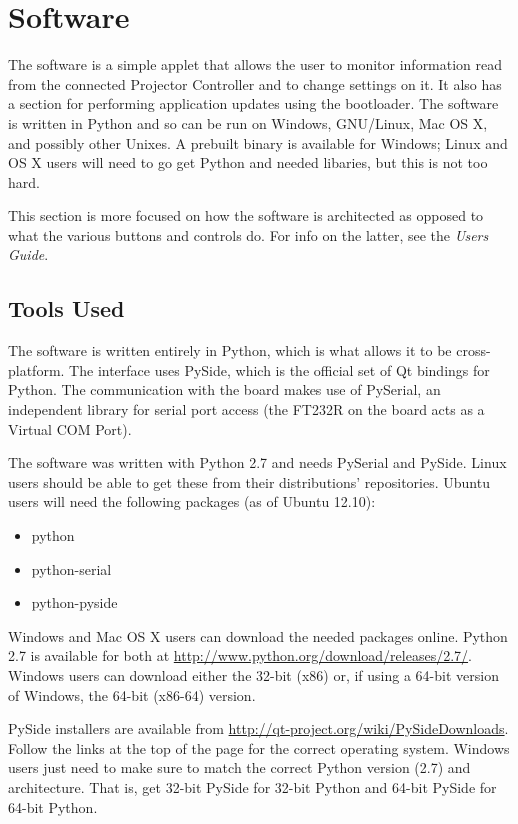 \documentclass{article}
\begin{document}
\section{Software} \label{sec:software}
The software is a simple applet that allows the user to monitor information read from the connected
Projector Controller and to change settings on it.  It also has a section for performing application
updates using the bootloader.  The software is written in Python and so can be run on Windows,
GNU/Linux, Mac OS X, and possibly other Unixes.  A prebuilt binary is available for Windows; Linux
and OS X users will need to go get Python and needed libaries, but this is not too hard.

This section is more focused on how the software is architected as opposed to what the various
buttons and controls do.  For info on the latter, see the \emph{Users Guide}.

\subsection{Tools Used} \label{ssec:SWTools} 
The software is written entirely in Python, which is what allows it to be cross-platform.  The
interface uses PySide, which is the official set of Qt bindings for Python.  The communication with
the board makes use of PySerial, an independent library for serial port access (the FT232R on the
board acts as a Virtual COM Port).

The software was written with Python 2.7 and needs PySerial and PySide.  Linux users should be able
to get these from their distributions' repositories.  Ubuntu users will need the following packages
(as of Ubuntu 12.10):

\begin{itemize}
  \item python
  \item python-serial
  \item python-pyside
\end{itemize}

Windows and Mac OS X users can download the needed packages online.  Python 2.7 is available for
both at \url{http://www.python.org/download/releases/2.7/}.  Windows users can download either the
32-bit (x86) or, if using a 64-bit version of Windows, the 64-bit (x86-64) version.

PySide installers are available from \url{http://qt-project.org/wiki/PySideDownloads}.  Follow the
links at the top of the page for the correct operating system.  Windows users just need to make sure
to match the correct Python version (2.7) and architecture.  That is, get 32-bit PySide for 32-bit
Python and 64-bit PySide for 64-bit Python.
\end{document}
